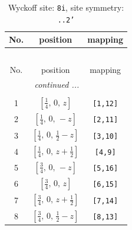 \documentclass[fleqn,8pt]{jsarticle}
\begin{document}
\renewcommand{\arraystretch}{1.2}
\begin{longtable}{ccc}
\caption{Wyckoff site: {\tt 8i}, site symmetry: {\tt ..2'}}
 \\
 \hline \hline
No. & position & mapping \\ \hline \endfirsthead

\multicolumn{2}{l}{\tablename\ \thetable{}} \\
 \hline \hline
No. & position & mapping \\ \hline \endhead

 \hline \hline
\multicolumn{2}{r}{\footnotesize\it continued ...} \\ \endfoot

 \hline \hline
\multicolumn{2}{r}{} \\ \endlastfoot

1 & $\left[ \frac{1}{4},\, 0,\, z \right]$ & {\tt [1,12]} \\ \hline
2 & $\left[ \frac{1}{4},\, 0,\, - z \right]$ & {\tt [2,11]} \\ \hline
3 & $\left[ \frac{1}{4},\, 0,\, \frac{1}{2} - z \right]$ & {\tt [3,10]} \\ \hline
4 & $\left[ \frac{1}{4},\, 0,\, z + \frac{1}{2} \right]$ & {\tt [4,9]} \\ \hline
5 & $\left[ \frac{3}{4},\, 0,\, - z \right]$ & {\tt [5,16]} \\ \hline
6 & $\left[ \frac{3}{4},\, 0,\, z \right]$ & {\tt [6,15]} \\ \hline
7 & $\left[ \frac{3}{4},\, 0,\, z + \frac{1}{2} \right]$ & {\tt [7,14]} \\ \hline
8 & $\left[ \frac{3}{4},\, 0,\, \frac{1}{2} - z \right]$ & {\tt [8,13]} \\
\end{longtable}
\renewcommand{\arraystretch}{1.2}
\end{document}

